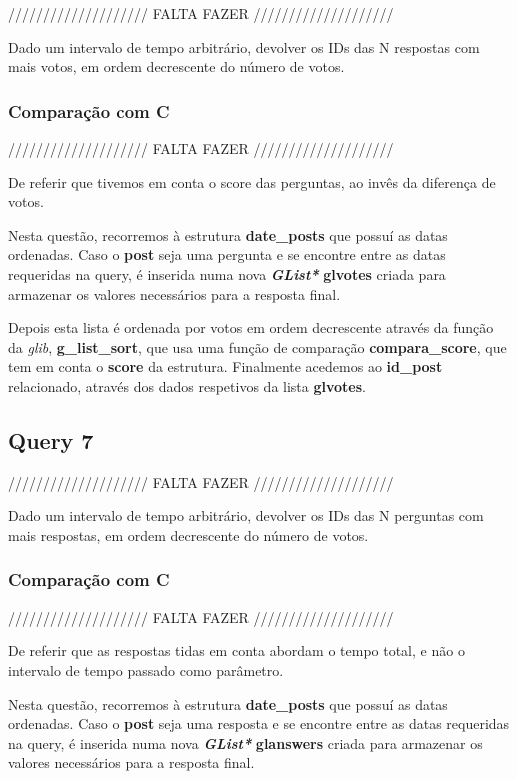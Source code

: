 \documentclass[a4paper]{article}
\begin{document}
//////////////////// FALTA FAZER ////////////////////

Dado um intervalo de tempo arbitrário, devolver os IDs das N respostas 
com mais votos, em ordem decrescente do número de votos.

\subsubsection{Comparação com C}

//////////////////// FALTA FAZER ////////////////////

De referir que tivemos em conta o score das perguntas, ao invês da
diferença de votos.

Nesta questão, recorremos à estrutura \textbf{date\_posts} que possuí 
as datas ordenadas. Caso o \textbf{post} seja uma pergunta e
se encontre entre as datas requeridas na query, é inserida numa nova
\textit{\textbf{GList*}} \textbf{glvotes} criada para armazenar os 
valores necessários para a resposta final.

Depois esta lista é ordenada por votos em ordem decrescente através da 
função da \textit{glib}, \textbf{g\_list\_sort}, que usa uma função de 
comparação \textbf{compara\_score}, que tem em conta o \textbf{score}
da estrutura. Finalmente acedemos ao \textbf{id\_post} relacionado, 
através dos dados respetivos da lista \textbf{glvotes}.

\subsection{Query 7}

//////////////////// FALTA FAZER ////////////////////

Dado um intervalo de tempo arbitrário, devolver os IDs das N perguntas 
com mais respostas, em ordem decrescente do número de votos.

\subsubsection{Comparação com C}

//////////////////// FALTA FAZER ////////////////////

De referir que as respostas tidas em conta abordam o tempo total, e
não o intervalo de tempo passado como parâmetro.

Nesta questão, recorremos à estrutura \textbf{date\_posts} que possuí 
as datas ordenadas. Caso o \textbf{post} seja uma resposta e
se encontre entre as datas requeridas na query, é inserida numa nova
\textit{\textbf{GList*}} \textbf{glanswers} criada para armazenar os 
valores necessários para a resposta final.
\end{document}
